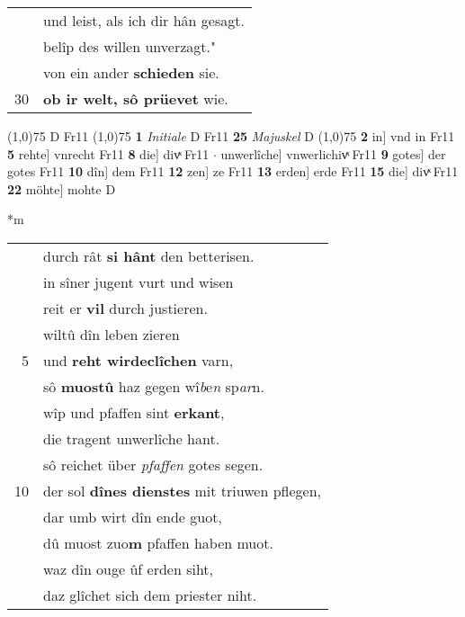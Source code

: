 \documentclass[8pt,a4paper,notitlepage]{article}
\begin{document}
\begin{table}[ht]
\begin{minipage}[t]{0.5\linewidth}
\begin{tabular}{rl}
 & und leist, als ich dir hân gesagt.\\ 
 & belîp des willen unverzagt."\\ 
 & von ein ander \textbf{schieden} sie.\\ 
30 & \textbf{ob ir welt, sô prüevet} wie.\\ 
\end{tabular}
\scriptsize
\line(1,0){75} \newline
D Fr11 \newline
\line(1,0){75} \newline
\textbf{1} \textit{Initiale} D Fr11  \textbf{25} \textit{Majuskel} D  \newline
\line(1,0){75} \newline
\textbf{2} in] vnd in Fr11 \textbf{5} rehte] vnrecht Fr11 \textbf{8} die] divͯ Fr11  $\cdot$ unwerlîche] vnwerlichivͯ Fr11 \textbf{9} gotes] der gotes Fr11 \textbf{10} dîn] dem Fr11 \textbf{12} zen] ze Fr11 \textbf{13} erden] erde Fr11 \textbf{15} die] divͯ Fr11 \textbf{22} möhte] mohte D \newline
\end{minipage}
\hspace{0.5cm}
\begin{minipage}[t]{0.5\linewidth}
\small
\begin{center}*m
\end{center}
\begin{tabular}{rl}
 & durch rât \textbf{si hânt} den betterisen.\\ 
 & in sîner jugent vurt und wisen\\ 
 & reit er \textbf{vil} durch justieren.\\ 
 & wiltû dîn leben zieren\\ 
5 & und \textbf{reht wirdeclîchen} varn,\\ 
 & sô \textbf{muostû} haz gegen wî\textit{b}e\textit{n} sp\textit{ar}n.\\ 
 & wîp und pfaffen sint \textbf{erkant},\\ 
 & die tragent unwerlîche hant.\\ 
 & sô reichet über \textit{pfaffen} gotes segen.\\ 
10 & der sol \textbf{dînes dienstes} mit triuwen pflegen,\\ 
 & dar umb wirt dîn ende guot,\\ 
 & dû muost zuo\textbf{m} pfaffen haben muot.\\ 
 & waz dîn ouge ûf erden siht,\\ 
 & daz glîchet sich dem priester niht.\\ 

\end{tabular}
\end{minipage}
\end{table}
\end{document}
